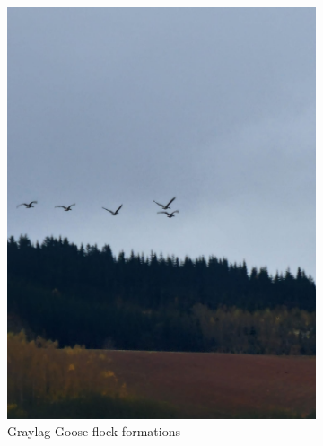 \documentclass[twocolumn]{article}
\begin{document}
\begin{figure}[H]
\begin{subfigure}{0.45\textwidth}
\includegraphics[width=\textwidth]{06_geese_flight_formation.jpg}
\caption{Graylag Goose flock formations}
\end{subfigure}
\hfill
\begin{subfigure}{0.45\textwidth}

\end{subfigure}
\end{figure}
\end{document}

